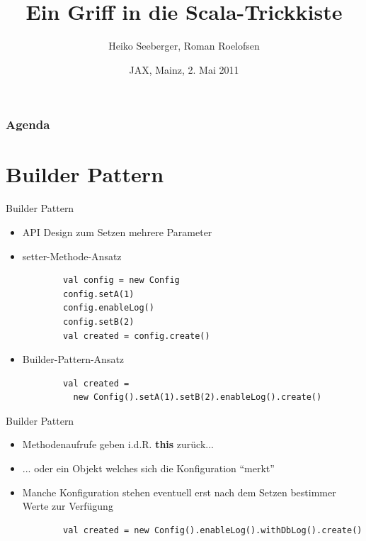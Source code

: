 \documentclass{beamer}
\title{Ein Griff in die Scala-Trickkiste}
\author{Heiko Seeberger, Roman Roelofsen}
\institute{WeigleWilczek}
\date{JAX, Mainz, 2. Mai 2011}
\begin{document}
\begin{frame}
  \titlepage
\end{frame}


\begin{frame}
  \frametitle{Agenda}
  \tableofcontents
\end{frame}



\section{Builder Pattern}


\begin{frame}[fragile]{Builder Pattern}
\begin{itemize}
	\item API Design zum Setzen mehrere Parameter
	\item setter-Methode-Ansatz
	\begin{lstlisting}
		val config = new Config
		config.setA(1)
		config.enableLog()
		config.setB(2)
		val created = config.create()
	\end{lstlisting}
	\item Builder-Pattern-Ansatz
	\begin{lstlisting}
		val created =
		  new Config().setA(1).setB(2).enableLog().create()
	\end{lstlisting}	
\end{itemize}
\end{frame}


\begin{frame}[fragile]{Builder Pattern}
\begin{itemize}
	\item Methodenaufrufe geben i.d.R. \textbf{this} zurück...
	\item ... oder ein Objekt welches sich die Konfiguration "`merkt"'
	\item Manche Konfiguration stehen eventuell erst nach dem Setzen bestimmer Werte zur Verfügung
	\begin{lstlisting}
		val created = new Config().enableLog().withDbLog().create()
	\end{lstlisting}
\end{itemize}
\end{frame}  
  
\end{document}
